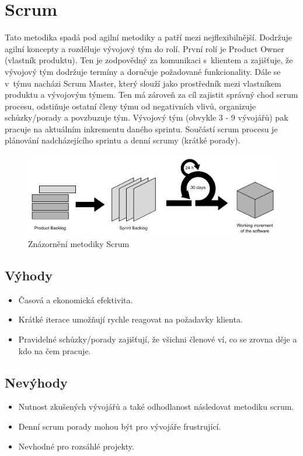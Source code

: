 \documentclass[thesis=M,czech]{FITthesis}[2019/12/23]
\begin{document}
\section{Scrum \cite{scrum}}
Tato metodika spadá pod agilní metodiky a patří mezi nejflexibilnější. Dodržuje agilní koncepty a rozděluje vývojový tým do rolí. První rolí je Product Owner (vlastník produktu). Ten je zodpovědný za komunikaci s~klientem a zajišťuje, že vývojový tým dodržuje termíny a doručuje požadované funkcionality. Dále se v~týmu nacházi Scrum Master, který slouží jako prostředník mezi vlastníkem produktu a vývojovým týmem. Ten má zároveň za cíl zajistit správný chod scrum procesu, odstiňuje ostatní členy týmu od negativních vlivů, organizuje schůzky/porady a povzbuzuje tým. Vývojový tým (obvykle 3 - 9 vývojářů) pak pracuje na aktuálním inkrementu daného sprintu. Součástí scrum procesu je plánování nadcházejícího sprintu a denní scrumy (krátké porady).

\begin{figure}
	\centering
	\includegraphics[width=1\linewidth]{images/scrum.pdf}
  	\caption{Znázornění metodiky Scrum}
  	\label{dia:scrum}
\end{figure}

\subsection*{Výhody}
\begin{itemize}
    \item Časová a ekonomická efektivita.
    \item Krátké iterace umožňují rychle reagovat na požadavky klienta.
    \item Pravidelné schůzky/porady zajišťují, že všichni členové ví, co se zrovna děje a kdo na čem pracuje.
\end{itemize}

\subsection*{Nevýhody}
\begin{itemize}
    \item Nutnost zkušených vývojářů a také odhodlanost následovat metodiku scrum.
    \item Denní scrum porady mohou být pro vývojáře frustrující.
    \item Nevhodné pro rozsáhlé projekty.
\end{itemize}
\end{document}
